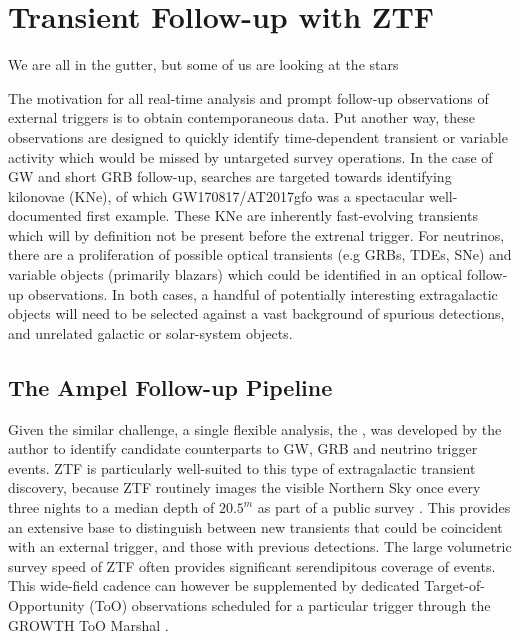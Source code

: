 \setchapterpreamble[u]{\margintoc}
\chapter{Transient Follow-up with ZTF}
\begin{fquote}We are all in the gutter, but some of us are looking at the stars
\end{fquote}

The motivation for all real-time analysis and prompt follow-up observations of external triggers is to obtain contemporaneous data. Put another way, these observations are designed to quickly identify time-dependent transient or variable activity which would be missed by untargeted survey operations.  In the case of GW and short GRB follow-up, searches are targeted towards identifying kilonovae (KNe), of which GW170817/AT2017gfo was a spectacular well-documented first example. These KNe are inherently fast-evolving transients which will by definition not be present before the extrenal trigger. For neutrinos, there are a proliferation of possible optical transients (e.g GRBs, TDEs, SNe) and variable objects (primarily blazars) which could be identified in an optical follow-up observations. In both cases, a handful of potentially interesting extragalactic objects will need to be selected against a vast background of spurious detections, and unrelated galactic or solar-system objects.

\section{The Ampel Follow-up Pipeline}
Given the similar challenge, a single flexible analysis, the \ztf, was developed by the author to identify candidate counterparts to GW, GRB and neutrino trigger events. ZTF is particularly well-suited to this type of extragalactic transient discovery,  because ZTF routinely images the visible Northern Sky once every three nights to a median depth of $20.5^{m}$ as part of a public survey .  This provides an extensive base to distinguish between new transients that could be coincident with an external trigger, and those with previous detections. The large volumetric survey speed of ZTF often provides significant serendipitous coverage of events. This wide-field cadence can however be supplemented by dedicated Target-of-Opportunity (ToO) observations scheduled for a particular trigger through the GROWTH ToO Marshal . 

